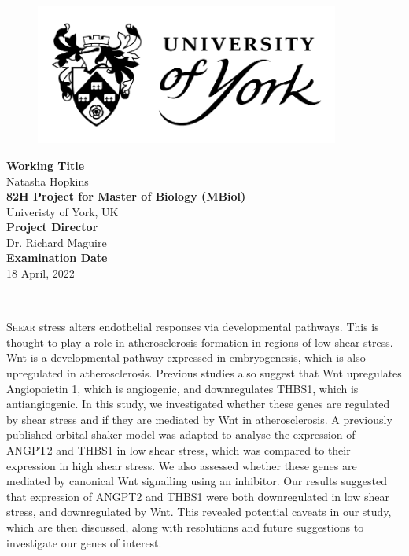\documentclass[
  11pt,
]{article}
\author{}
\date{\vspace{-2.5em}}
\begin{document}
\captionsetup{justification=raggedright,singlelinecheck=false}

\begin{center}
\begin{figure}[h!]
\centering
  \includegraphics[width=10cm]{../images/uoy_logo.png}
  \label{}
\end{figure}
\vspace*{2\baselineskip}
\Large{\textbf{Working Title}}\\
Natasha Hopkins\\
\vspace*{2\baselineskip}
\Large{\textbf{82H Project for Master of Biology (MBiol)}}\\
\Large{Univeristy of York, UK}\\
\vspace*{2\baselineskip}
\Large{\textbf{Project Director}}\\
Dr. Richard Maguire\\
\vspace*{2\baselineskip}
\Large{\textbf{Examination Date}}\\
18 April, 2022
\end{center}

\hypersetup{linkcolor = black}
\newpage
\tableofcontents
\hypersetup{linkcolor = teal}

\newpage
\linenumbers
{}
\rule{\textwidth}{0.4pt}\\
\lettrine[lines=2,slope=0pt,nindent=0pt, loversize=0.2]{S}{hear} stress alters endothelial responses via developmental pathways. This is thought to play a role in atherosclerosis formation in regions of low shear stress. Wnt is a developmental pathway expressed in embryogenesis, which is also upregulated in atherosclerosis. Previous studies also suggest that Wnt upregulates Angiopoietin 1, which is angiogenic, and downregulates THBS1, which is antiangiogenic. In this study, we investigated whether these genes are regulated by shear stress and if they are mediated by Wnt in atherosclerosis. A previously published orbital shaker model was adapted to analyse the expression of ANGPT2 and THBS1 in low shear stress, which was compared to their expression in high shear stress. We also assessed whether these genes are mediated by canonical Wnt signalling using an inhibitor. Our results suggested that expression of ANGPT2 and THBS1 were both downregulated in low shear stress, and downregulated by Wnt. This revealed potential caveats in our study, which are then discussed, along with resolutions and future suggestions to investigate our genes of interest.\\
\end{document}
